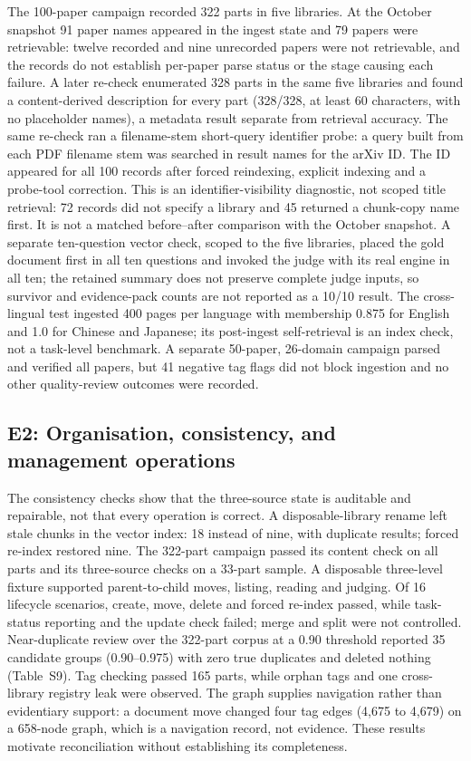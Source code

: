 \documentclass[11pt]{article}
\begin{document}
The 100-paper campaign recorded 322 parts in five libraries. At the October
snapshot 91 paper names appeared in the ingest state and 79 papers were
retrievable: twelve recorded and nine unrecorded papers were not retrievable,
and the records do not establish per-paper parse status or the stage causing
each failure. A later re-check enumerated 328 parts in the same five
libraries and found a content-derived description for every part (328/328,
at least 60 characters, with no placeholder names), a metadata result
separate from retrieval accuracy. The same re-check ran a filename-stem
short-query identifier probe: a query built from each PDF filename stem was
searched in result names for the arXiv ID. The ID appeared for all 100
records after forced reindexing, explicit indexing and a probe-tool
correction. This is an identifier-visibility diagnostic, not scoped title
retrieval: 72 records did not specify a library and 45 returned a chunk-copy
name first. It is not a matched before--after comparison with the October
snapshot. A separate ten-question vector check, scoped to the five
libraries, placed the gold document first in all ten questions and invoked
the judge with its real engine in all ten; the retained summary does not
preserve complete judge inputs, so survivor and evidence-pack counts are not
reported as a 10/10 result. The cross-lingual test ingested 400 pages per
language with membership 0.875 for English and 1.0 for Chinese and Japanese;
its post-ingest self-retrieval is an index check, not a task-level
benchmark. A separate 50-paper, 26-domain campaign parsed and verified all
papers, but 41 negative tag flags did not block ingestion and no other
quality-review outcomes were recorded.

\subsection{E2: Organisation, consistency, and management operations}

The consistency checks show that the three-source state is auditable and
repairable, not that every operation is correct. A disposable-library rename
left stale chunks in the vector index: 18 instead of nine, with duplicate
results; forced re-index restored nine. The 322-part campaign passed its
content check on all parts and its three-source checks on a 33-part sample.
A disposable three-level fixture supported parent-to-child moves, listing,
reading and judging. Of 16 lifecycle scenarios, create, move, delete and
forced re-index passed, while task-status reporting and the update check
failed; merge and split were not controlled. Near-duplicate review over the
322-part corpus at a 0.90 threshold reported 35 candidate groups
(0.90--0.975) with zero true duplicates and deleted nothing (Table~S9).
Tag checking passed 165 parts,
while orphan tags and one cross-library registry leak were observed. The
graph supplies navigation rather than evidentiary support: a document move
changed four tag edges (4,675 to 4,679) on a 658-node graph, which is a
navigation record, not evidence. These results motivate reconciliation
without establishing its completeness.
\end{document}
